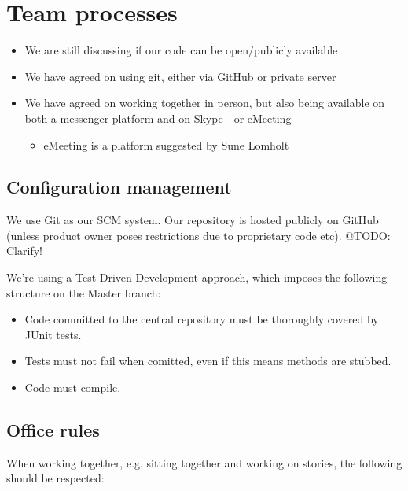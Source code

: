 \documentclass[a4paper,11pt]{article}
\begin{document}

\section{Team processes} %
\label{sec:team_processes}

\begin{itemize}
	\item We are still discussing if our code can be open/publicly available
	\item We have agreed on using git, either via GitHub or private server
	
	\item We have agreed on working together in person, but also being available on both a messenger platform and on Skype - or eMeeting
	\begin{itemize}
		\item eMeeting is a platform suggested by Sune Lomholt
	\end{itemize}
\end{itemize}

\subsection{Configuration management} %
\label{subsec:configuration_management}

We use Git as our SCM system. Our repository is hosted publicly on GitHub (unless product owner poses restrictions due to proprietary code etc). @TODO: Clarify!

We're using a Test Driven Development approach, which imposes the following structure on the Master branch:
\begin{itemize}
\item Code committed to the central repository must be thoroughly covered by JUnit tests.
\item Tests must not fail when comitted, even if this means methods are stubbed.
\item Code must compile.
\end{itemize}


\subsection{Office rules} %
\label{subsec:office_rules}
When working together, e.g. sitting together and working on stories, the following should be respected:
\end{document}
